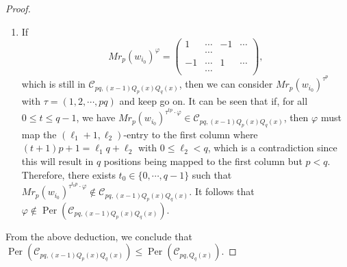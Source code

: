 \documentclass[journal,12pt,onecolumn]{IEEEtran}
\begin{document}
\begin{proof}
\begin{enumerate}
\[\begin{pmatrix}
                1 & -1 & \cdots \\
                -1 & & \cdots \\
                1  & & \cdots \\
                  & & \cdots
            \end{pmatrix},\,\begin{pmatrix}
                1 & -1 & -1 & 1 & \cdots \\
                  & & \cdots  & 
            \end{pmatrix}, 
        \]
        then we can easily derive that the above four codewords are not in $\mathcal{C}_{pq,Q_q(x)}$, and of course not in $\mathcal{C}_{pq,(x-1)Q_p(x)Q_q(x)}$. Therefore, we have $\varphi\notin \operatorname{Per}(\mathcal{C}_{pq,(x-1)Q_p(x)Q_q(x)})$. 
        
        \item If 
        \[
            Mr_p(w_{i_0})^\varphi= \begin{pmatrix}
                1 & \cdots & -1 & \cdots \\
                  & \cdots &  & \\
                -1 & \cdots & 1 & \cdots \\
                  & \cdots &  & 
            \end{pmatrix},
        \]
        which is still in $\mathcal{C}_{pq,(x-1)Q_p(x)Q_q(x)}$, then we can consider $Mr_p(w_{i_0})^{\tau^{p}}$ with $\tau = (1,2,\cdots,pq)$ and keep go on. It can be seen that if, for all $0\le t\le q-1$, we have $Mr_p(w_{i_0})^{\tau^{tp}\cdot\varphi}\in \mathcal{C}_{pq,(x-1)Q_p(x)Q_q(x)}$, then $\varphi$ must map the $(\ell_1+1,\ell_2)$-entry to the first column where $(t+1)p+1 = \ell_1q+\ell_2$ with $0\le \ell_2<q$, which is a contradiction since this will result in $q$ positions being mapped to the first column but $p<q$. Therefore, there exists $t_0\in \{0,\cdots,q-1\}$ such that $Mr_p(w_{i_0})^{\tau^{t_0p}\cdot\varphi}\notin \mathcal{C}_{pq,(x-1)Q_p(x)Q_q(x)}$. It follows that $\varphi\notin \operatorname{Per}(\mathcal{C}_{pq,(x-1)Q_p(x)Q_q(x)})$. 
    \end{enumerate}
    From the above deduction, we conclude that $\operatorname{Per}(\mathcal{C}_{pq,(x-1)Q_p(x)Q_q(x)})\leqslant \operatorname{Per}(\mathcal{C}_{pq,Q_q(x)})$. 


\end{proof}
\end{document}

